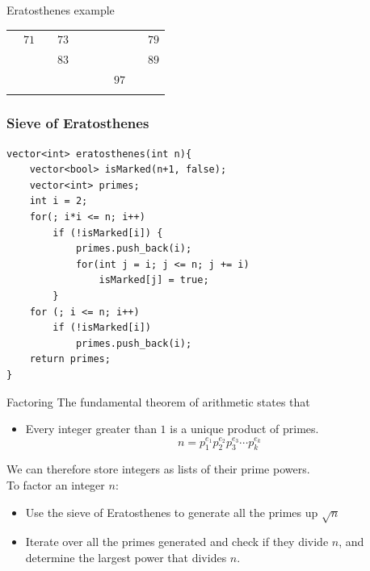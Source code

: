 \documentclass{beamer}
\begin{document}
\begin{frame}[plain]{Eratosthenes example}
{\begin{tabular}{r r r r r r r r r r}
			                   & \color{black} $71$ &                    & \color{black} $73$ &                    &                    &                    &                    &                    & \color{black} $79$\\
			                   &                    &                    & \color{black} $83$ &                    &                    &                    &                    &                    & \color{black} $89$\\
			                   &                    &                    &                    &                    &                    &                    & \color{black} $97$ &                    &                   \\
			\phantom{$888$} & \phantom{$888$} & \phantom{$888$} & \phantom{$888$} & \phantom{$888$} & \phantom{$888$} & \phantom{$888$} & \phantom{$888$} & \phantom{$888$} & \phantom{$888$}
        \end{tabular}
	}
\end{frame}

\begin{frame}
  \frametitle{Sieve of Eratosthenes}
      \begin{verbatim}
vector<int> eratosthenes(int n){
    vector<bool> isMarked(n+1, false);
    vector<int> primes;
    int i = 2;
    for(; i*i <= n; i++)
        if (!isMarked[i]) {
            primes.push_back(i);
            for(int j = i; j <= n; j += i)
                isMarked[j] = true;
        }
    for (; i <= n; i++)
        if (!isMarked[i])
            primes.push_back(i);
    return primes;
}
    \end{verbatim}
\end{frame}


\begin{frame}[plain]{Factoring}
  \vspace{10pt}
  The fundamental theorem of arithmetic states that
  \begin{itemize}
    \item Every integer greater than $1$ is a unique product of primes.
    \[
      n = p_1^{e_1}p_2^{e_2}p_3^{e_3}\cdots p_k^{e_k}
    \]
  \end{itemize}
  We can therefore store integers as lists of their prime powers. \\
  \vspace{10pt}
  To factor an integer $n$:
  \begin{itemize}
    \item Use the sieve of Eratosthenes to generate all the primes up
      $\sqrt{n}$
    \item Iterate over all the primes generated and check if they divide $n$,
      and determine the largest power that divides $n$.
  \end{itemize}
\end{frame}
\end{document}
